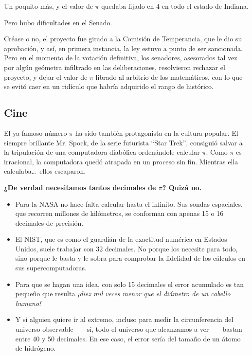 {Un poquito más, y el valor de $\pi$ quedaba fijado en 4 en todo el estado de Indiana. 

Pero hubo dificultades en el Senado.

Créase o no, el proyecto fue girado a la Comisión de Temperancia, que le dio su aprobación, y así, en primera instancia, 
la ley estuvo a punto de ser sancionada. Pero en el momento de la votación definitiva, los senadores, asesorados tal vez por algún 
geómetra infiltrado en las deliberaciones, resolvieron rechazar el proyecto, y dejar el valor de $\pi$ librado al arbitrio de los matemáticos, 
con lo que se evitó caer en un ridículo que habría adquirido el rango de histórico.

\subsection*{Cine}
El ya famoso número $\pi$ ha sido también protagonista en la cultura popular. El siempre brillante Mr. Spock, de la serie futurista ``Star Trek'', consiguió 
salvar a la tripulación de una computadora diabólica ordenándole calcular $\pi$. Como $\pi$ es irracional, la computadora quedó 
atrapada en un proceso sin fin. Mientras ella calculaba\ldots\ ellos escaparon.
\clearpage

\begin{center}
\textbf{¿De verdad necesitamos tantos decimales de $\pi$? Quizá no.}
\end{center}

\begin{itemize}
  \item Para la NASA no hace falta calcular hasta el infinito. Sus sondas espaciales, que recorren millones de kilómetros, se conforman con apenas 15 o 16 decimales de precisión.
  \item El NIST, que es como el guardián de la exactitud numérica en Estados Unidos, suele trabajar con 32 decimales. No porque los necesite para todo, sino porque le basta y le sobra para comprobar la fidelidad de los cálculos en sus supercomputadoras.
  \item Para que se hagan una idea, con solo 15 decimales el error acumulado es tan pequeño que resulta \emph{¡diez mil veces menor que el diámetro de un cabello humano!}
  \item Y si alguien quiere ir al extremo, incluso para medir la circunferencia del universo observable \,---\, sí, todo el universo que alcanzamos a ver \,---\, bastan entre 40 y 50 decimales. En ese caso, el error sería del tamaño de un átomo de hidrógeno.
\end{itemize}

}
